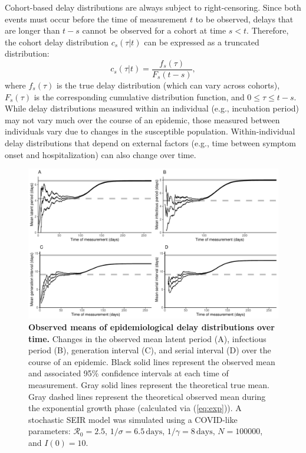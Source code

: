 \documentclass[12pt]{article}
\newcommand{\eref}[1]{(\ref{eq:#1})}
\begin{document}
Cohort-based delay distributions are always subject to right-censoring.
Since both events must occur before the time of measurement $t$ to be observed, delays that are longer than $t-s$ cannot be observed for a cohort at time $s < t$.
Therefore, the cohort delay distribution $c_s(\tau|t)$ can be expressed as a truncated distribution:
\begin{equation}
c_s(\tau|t) = \frac{f_s(\tau)}{F_s(t-s)},
\end{equation}
where $f_s(\tau)$ is the true delay distribution (which can vary across cohorts), $F_s(\tau)$ is the corresponding cumulative distribution function, and $0 \leq \tau \leq t-s$.
While delay distributions measured within an individual (e.g., incubation period) may not vary much over the course of an epidemic, those measured between individuals vary due to changes in the susceptible population.
Within-individual delay distributions that depend on external factors (e.g., time between symptom onset and hospitalization) can also change over time.

\begin{figure}[!th]
\includegraphics[width=\textwidth]{figure_seir.pdf}
\caption{
\textbf{Observed means of epidemiological delay distributions over time.}
Changes in the observed mean latent period (A), infectious period (B), generation interval (C), and serial interval (D) over the course of an epidemic.
Black solid lines represent the observed mean and associated 95\% confidence intervals at each time of measurement.
Gray solid lines represent the theoretical true mean.
Gray dashed lines represent the theoretical observed mean during the exponential growth phase (calculated via \eref{exp}).
A stochastic SEIR model was simulated using a COVID-like parameters: $\mathcal R_0 = 2.5$, $1/\sigma = 6.5\,\textrm{days}$, $1/\gamma = 8\,\textrm{days}$, $N=100000$, and $I(0)=10$.
}
\label{fig:seir}
\end{figure}
\end{document}
